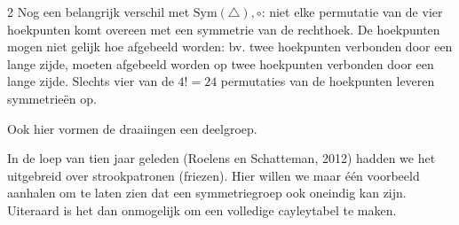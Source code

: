 \begin{multicols}{2}
Nog een belangrijk verschil met $\text{Sym}(\triangle),\circ$: niet elke permutatie van de vier hoekpunten komt overeen met een symmetrie van de rechthoek. De hoekpunten mogen niet gelijk hoe afgebeeld worden: bv. twee hoekpunten verbonden door een lange zijde, moeten afgebeeld worden op twee hoekpunten verbonden door een lange zijde. Slechts vier van de $4!=24$ permutaties van de hoekpunten leveren symmetrieën op.

Ook hier vormen de draaiingen een deelgroep.

In de loep van tien jaar geleden (Roelens en Schatteman, 2012) hadden we het uitgebreid over strookpatronen (friezen). Hier willen we maar één voorbeeld aanhalen om te laten zien dat een symmetriegroep ook oneindig kan zijn. Uiteraard is het dan onmogelijk om een volledige cayleytabel te maken.

\end{multicols}

